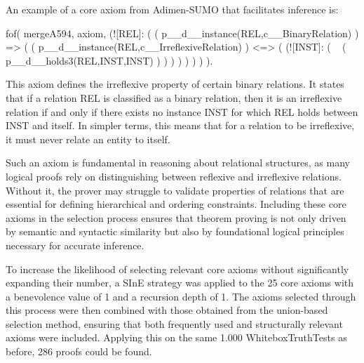 \documentclass[english,version-2020-11]{uzl-thesis}
\begin{document}
An example of a core axiom from Adimen-SUMO that facilitates inference is:


\begin{Pseudocode}[morekeywords = {add, create}, deletekeywords={to}, numbers=left, caption = {Example core axiom}]
    fof( mergeA594, axiom,
        (![REL]: 
            (
                (
                    p__d__instance(REL,c__BinaryRelation)
                )
                =>
                (
                    (
                        p__d__instance(REL,c__IrreflexiveRelation)
                    )
                    <=>
                    (
                        (![INST]: 
                            (
                                ~ (
                                    p__d__holds3(REL,INST,INST)
                                )
                            )
                        )
                    )
                )
            )
        )
    ).
\end{Pseudocode}


This axiom defines the irreflexive property of certain binary relations. It states that if a relation REL is classified as a binary relation, then it is an irreflexive relation if and only if there exists no instance INST for which REL holds between INST and itself. In simpler terms, this means that for a relation to be irreflexive, it must never relate an entity to itself.

Such an axiom is fundamental in reasoning about relational structures, as many logical proofs rely on distinguishing between reflexive and irreflexive relations. Without it, the prover may struggle to validate properties of relations that are essential for defining hierarchical and ordering constraints. Including these core axioms in the selection process ensures that theorem proving is not only driven by semantic and syntactic similarity but also by foundational logical principles necessary for accurate inference.

To increase the likelihood of selecting relevant core axioms without significantly expanding their number, a SInE strategy was applied to the 25 core axioms with a benevolence value of 1 and a recursion depth of 1. The axioms selected through this process were then combined with those obtained from the union-based selection method, ensuring that both frequently used and structurally relevant axioms were included. Applying this on the same 1.000 WhiteboxTruthTests as before, 286 proofs could be found.
\end{document}
